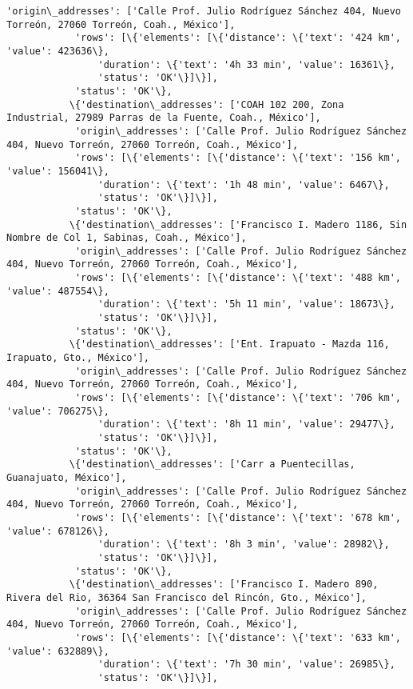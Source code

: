 \documentclass[11pt]{article}
\begin{document}
\begin{Verbatim}[commandchars=\\\{\}]
            'origin\_addresses': ['Calle Prof. Julio Rodríguez Sánchez 404, Nuevo Torreón, 27060 Torreón, Coah., México'],
            'rows': [\{'elements': [\{'distance': \{'text': '424 km', 'value': 423636\},
                'duration': \{'text': '4h 33 min', 'value': 16361\},
                'status': 'OK'\}]\}],
            'status': 'OK'\},
           \{'destination\_addresses': ['COAH 102 200, Zona Industrial, 27989 Parras de la Fuente, Coah., México'],
            'origin\_addresses': ['Calle Prof. Julio Rodríguez Sánchez 404, Nuevo Torreón, 27060 Torreón, Coah., México'],
            'rows': [\{'elements': [\{'distance': \{'text': '156 km', 'value': 156041\},
                'duration': \{'text': '1h 48 min', 'value': 6467\},
                'status': 'OK'\}]\}],
            'status': 'OK'\},
           \{'destination\_addresses': ['Francisco I. Madero 1186, Sin Nombre de Col 1, Sabinas, Coah., México'],
            'origin\_addresses': ['Calle Prof. Julio Rodríguez Sánchez 404, Nuevo Torreón, 27060 Torreón, Coah., México'],
            'rows': [\{'elements': [\{'distance': \{'text': '488 km', 'value': 487554\},
                'duration': \{'text': '5h 11 min', 'value': 18673\},
                'status': 'OK'\}]\}],
            'status': 'OK'\},
           \{'destination\_addresses': ['Ent. Irapuato - Mazda 116, Irapuato, Gto., México'],
            'origin\_addresses': ['Calle Prof. Julio Rodríguez Sánchez 404, Nuevo Torreón, 27060 Torreón, Coah., México'],
            'rows': [\{'elements': [\{'distance': \{'text': '706 km', 'value': 706275\},
                'duration': \{'text': '8h 11 min', 'value': 29477\},
                'status': 'OK'\}]\}],
            'status': 'OK'\},
           \{'destination\_addresses': ['Carr a Puentecillas, Guanajuato, México'],
            'origin\_addresses': ['Calle Prof. Julio Rodríguez Sánchez 404, Nuevo Torreón, 27060 Torreón, Coah., México'],
            'rows': [\{'elements': [\{'distance': \{'text': '678 km', 'value': 678126\},
                'duration': \{'text': '8h 3 min', 'value': 28982\},
                'status': 'OK'\}]\}],
            'status': 'OK'\},
           \{'destination\_addresses': ['Francisco I. Madero 890, Rivera del Rio, 36364 San Francisco del Rincón, Gto., México'],
            'origin\_addresses': ['Calle Prof. Julio Rodríguez Sánchez 404, Nuevo Torreón, 27060 Torreón, Coah., México'],
            'rows': [\{'elements': [\{'distance': \{'text': '633 km', 'value': 632889\},
                'duration': \{'text': '7h 30 min', 'value': 26985\},
                'status': 'OK'\}]\}],

\end{Verbatim}
\end{document}
